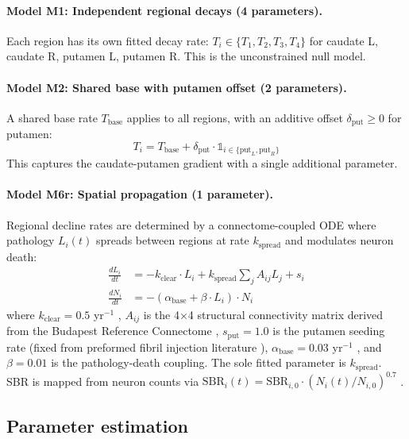 \paragraph{Model M1: Independent regional decays (4 parameters).}
Each region has its own fitted decay rate: $T_i \in \{T_1, T_2, T_3, T_4\}$ for caudate L, caudate R, putamen L, putamen R. This is the unconstrained null model.

\paragraph{Model M2: Shared base with putamen offset (2 parameters).}
A shared base rate $T_{\text{base}}$ applies to all regions, with an additive offset $\delta_{\text{put}} \geq 0$ for putamen:
\begin{equation}
T_i = T_{\text{base}} + \delta_{\text{put}} \cdot \mathbb{1}_{i \in \{\text{put}_L, \text{put}_R\}}
\end{equation}
This captures the caudate-putamen gradient with a single additional parameter.

\paragraph{Model M6r: Spatial propagation (1 parameter).}
Regional decline rates are determined by a connectome-coupled ODE where pathology $L_i(t)$ spreads between regions at rate $k_{\text{spread}}$ and modulates neuron death:
\begin{align}
\frac{dL_i}{dt} &= -k_{\text{clear}} \cdot L_i + k_{\text{spread}} \sum_j A_{ij} L_j + s_i \\
\frac{dN_i}{dt} &= -(\alpha_{\text{base}} + \beta \cdot L_i) \cdot N_i
\end{align}
where $k_{\text{clear}} = 0.5$ yr$^{-1}$ \cite{xu2024}, $A_{ij}$ is the 4$\times$4 structural connectivity matrix derived from the Budapest Reference Connectome \cite{schafer2021}, $s_{\text{put}} = 1.0$ is the putamen seeding rate (fixed from preformed fibril injection literature \cite{chu2019, patterson2019}), $\alpha_{\text{base}} = 0.03$ yr$^{-1}$ \cite{fearnley1991}, and $\beta = 0.01$ is the pathology-death coupling. The sole fitted parameter is $k_{\text{spread}}$. SBR is mapped from neuron counts via $\text{SBR}_i(t) = \text{SBR}_{i,0} \cdot (N_i(t)/N_{i,0})^{0.7}$ \cite{lee2019}.

\subsection{Parameter estimation}

